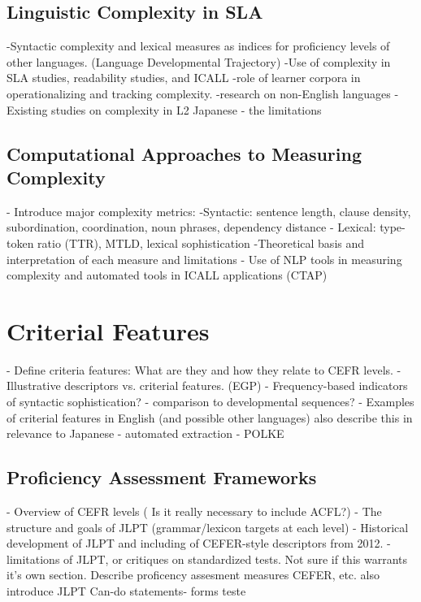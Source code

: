 
\subsection{Linguistic Complexity in SLA}
-Syntactic complexity and lexical measures as indices for proficiency levels of other languages. (Language Developmental Trajectory)
-Use of complexity in SLA studies, readability studies, and ICALL
-role of learner corpora in operationalizing and tracking complexity.
-research on non-English languages
-Existing studies on complexity in L2 Japanese - the limitations


\subsection{Computational Approaches to Measuring Complexity}
- Introduce major complexity metrics:
    -Syntactic: sentence length, clause density, subordination, coordination, noun phrases, dependency distance
    - Lexical: type-token ratio (TTR), MTLD, lexical sophistication
-Theoretical basis and interpretation of each measure and limitations
- Use of NLP tools in measuring complexity and automated tools in ICALL applications (CTAP)

\section{Criterial Features}
- Define criteria features: What are they and how they relate to CEFR levels.
- Illustrative descriptors vs. criterial features. (EGP)
- Frequency-based indicators of syntactic sophistication? \cite{Ellis2004}
    - comparison to developmental sequences?
- Examples of criterial features in English (and possible other languages) also describe this in relevance to Japanese
- automated extraction - POLKE


\subsection{Proficiency Assessment Frameworks}
- Overview of CEFR levels ( Is it really necessary to include ACFL?)
- The structure and goals of JLPT (grammar/lexicon targets at each level)
- Historical development of JLPT and including of CEFER-style descriptors from 2012.
- limitations of JLPT, or critiques on standardized tests.
Not sure if this warrants it's own section. Describe proficency assesment measures CEFER, etc. also introduce JLPT
Can-do statements- forms teste



